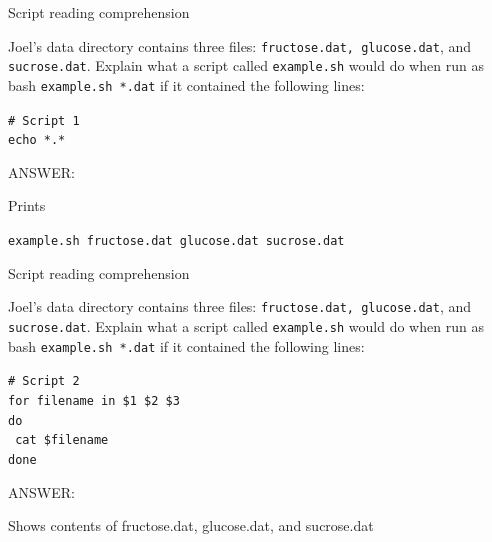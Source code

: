 \documentclass{beamer}
\begin{document}

\begin{frame}{Script reading comprehension}

Joel's data directory contains three files: \texttt{fructose.dat, glucose.dat}, and \texttt{sucrose.dat}. Explain what a script called \texttt{example.sh} would do when run as bash \texttt{example.sh *.dat} if it contained the following lines:
\vspace{0.5cm}


\begin{beamerboxesrounded}[upper=uppercolgreen,lower=lowercolgreen,shadow=false]{}
\small{\texttt{\# Script 1\\
echo *.*}}
\end{beamerboxesrounded}

\alert{ANSWER:}

Prints

\texttt{example.sh fructose.dat   glucose.dat    sucrose.dat}

\end{frame}


\begin{frame}{Script reading comprehension}

Joel's data directory contains three files: \texttt{fructose.dat, glucose.dat}, and \texttt{sucrose.dat}. Explain what a script called \texttt{example.sh} would do when run as bash \texttt{example.sh *.dat} if it contained the following lines:
\vspace{0.5cm}

\begin{beamerboxesrounded}[upper=uppercolgreen,lower=lowercolgreen,shadow=false]{}
\small{\texttt{\# Script 2\\
for filename in \$1 \$2 \$3\\
do\\}
\texttt{         cat \$filename\\}
\texttt{done\\}}
\end{beamerboxesrounded}

\alert{ANSWER:}

Shows contents of fructose.dat, glucose.dat, and sucrose.dat

\end{frame}
\end{document}
